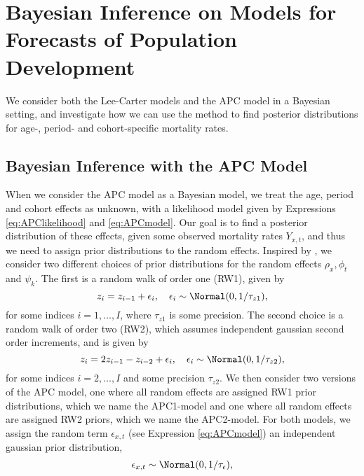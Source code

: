 \newpage
\section{Bayesian Inference on Models for Forecasts of Population Development}
\label{sec:BayesianInference}
We consider both the Lee-Carter models and the APC model in a Bayesian setting, and investigate how we can use the \inla method to find posterior distributions for age-, period- and cohort-specific mortality rates. 


\subsection{Bayesian Inference with the APC Model}
\label{sec:BayesianInferenceAPC}
When we consider the APC model as a Bayesian model, we treat the age, period and cohort effects as unknown, with a likelihood model given by Expressions \ref{eq:APClikelihood} and \ref{eq:APCmodel}. Our goal is to find a posterior distribution of these effects, given some observed mortality rates $Y_{x,t}$, and thus we need to assign prior distributions to the random effects. Inspired by \parencite{RieblerThesis2010}, we consider two different choices of prior distributions for the random effects $\rho_x, \phi_t$ and $\psi_k$. The first is a random walk of order one (RW1), given by
\begin{equation}
    z_i = z_{i-1} + \epsilon_i, \quad \epsilon_i \sim \Normal(0,1/\tau_{z1}),
    \label{eq:APCrw1}
\end{equation}
for some indices $i = 1,\ldots,I$, where $\tau_{z1}$ is some precision. The second choice is a random walk of order two (RW2), which assumes independent gaussian second order increments, and is given by
\begin{equation}
    z_i = 2z_{i-1} - z_{i-2} + \epsilon_i, \quad \epsilon_i \sim \Normal(0, 1/\tau_{z2}),
    \label{eq:APCrw2}
\end{equation}
for some indices $i = 2,\ldots,I$ and some precision $\tau_{z2}$. We then consider two versions of the APC model, one where all random effects are assigned RW1 prior distributions, which we name the APC1-model and one where all random effects are assigned RW2 priors, which we name the APC2-model. For both models, we assign the random term $\epsilon_{x,t}$ (see Expression \ref{eq:APCmodel}) an independent gaussian prior distribution,
\begin{equation}
    \epsilon_{x,t} \sim \Normal(0,1/\tau_\epsilon),
\end{equation}
